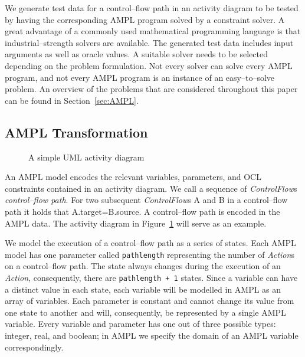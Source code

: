 \documentclass[runningheads,a4paper]{llncs}%
\newcommand{\UMLType}[1]{\textsf{\textit{#1}}} %
\newcommand{\UMLReference}[1]{\textsf{\textit{#1}}} %
\newcommand{\AMPLCode}[1]{\texttt{#1}}
\begin{document}
We generate test data for a control--flow path in an activity diagram to be
tested by having the corresponding AMPL program solved by a constraint solver.
A great advantage of a commonly used mathematical programming language is that
industrial--strength solvers are available. The generated test data includes
input arguments as well as oracle values. A suitable solver needs to be selected
depending on the problem formulation. Not every solver can solve every AMPL
program, and not every AMPL program is an instance of an easy--to--solve
problem. An overview of the problems that are considered throughout this paper
can be found in Section~\ref{sec:AMPL}.
\subsection{AMPL Transformation}%
\label{sec:AMPLTransformation}%
\begin{figure}%
\def\svgwidth{\textwidth}%
\graphicspath{{./pics/}}%
%
\caption{A simple UML activity diagram}%
\label{fig:AssignmentDecision}%
\end{figure}%
An AMPL model encodes the relevant variables, parameters, and OCL constraints
contained in an activity diagram. We call a sequence of
\UMLReference{ControlFlow}s \emph{control--flow path}. For two subsequent
\UMLType{ControlFlow}s A and B in a control--flow path it holds that
A.target=B.source. A control--flow path is encoded in the AMPL data. The
activity diagram in Figure~\ref{fig:AssignmentDecision} will serve as an
example.

We model the execution of a control--flow path as a series of states. Each AMPL
model has one parameter called \AMPLCode{pathlength} representing the number of
\UMLType{Action}s on a control--flow path. The state always changes during the
execution of an \UMLType{Action}, consequently, there are \AMPLCode{pathlength +
1} states. Since a variable can have a distinct value in each state, each
variable will be modelled in AMPL as an array of variables. Each parameter is
constant and cannot change its value from one state to another and will,
consequently, be represented by a single AMPL variable. Every variable and
parameter has one out of three possible types: integer, real, and boolean; in
AMPL we specify the domain of an AMPL variable correspondingly.
\end{document}
